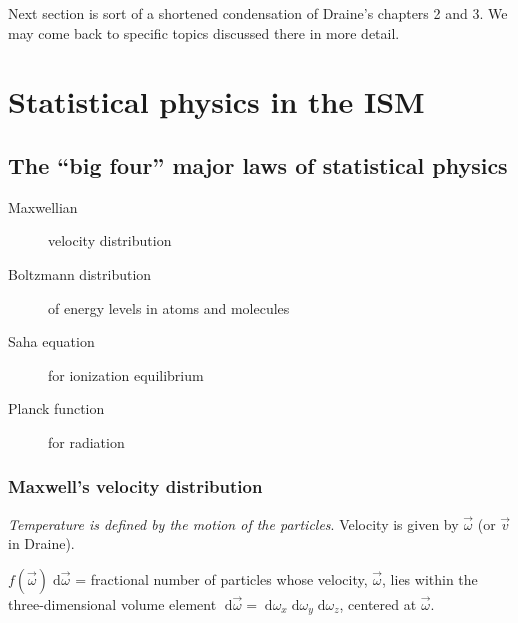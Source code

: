 \documentclass[11pt]{article}
\newcommand{\mar}[1]{\hspace{0pt}\marginpar{-\textcolor{black}{#1}-}}
\newcommand{\mynotes}[1]{{\fontfamily{cmss}\selectfont \textit{#1}}}
\begin{document}
\mar{16}Next section is sort of a shortened condensation of Draine's chapters 2
and 3. We may come back to specific topics discussed there in more detail.

\newpage
\section{Statistical physics in the ISM}
\subsection{The ``big four'' major laws of statistical physics}
\begin{description}
    \item [Maxwellian] velocity distribution
    \item [Boltzmann distribution] of energy levels in atoms and molecules
    \item [Saha equation] for ionization equilibrium
    \item [Planck function] for radiation
\end{description}

\subsubsection{Maxwell's velocity distribution}
\mynotes{Temperature is defined by the motion of the particles}.
Velocity is given by $\vec{\omega}$ (or $\vec{v}$ in Draine).

$f(\vec{\omega})\;\mathrm{d}\vec{\omega}$ =
fractional number of particles whose velocity, $\vec{\omega}$, lies within the
three-dimensional volume element
$\;\mathrm{d}\vec{\omega} =
\;\mathrm{d}\omega_{x}\;\mathrm{d}\omega_{y}\;\mathrm{d}\omega_{z}$,
centered at $\vec{\omega}$.
\end{document}
